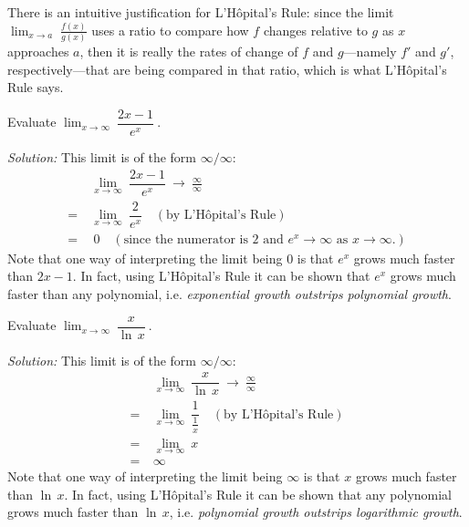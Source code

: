 There is an intuitive justification for L'H\^{o}pital's Rule: since the limit
$\lim_{x \to a}\;\frac{f(x)}{g(x)}$
uses a ratio to compare how $f$ changes relative to $g$ as $x$ approaches $a$,
then it is really the rates of change of $f$ and $g$---namely $f'$ and $g'$,
respectively---that are being compared in that ratio, which is what
L'H\^{o}pital's Rule says.

\begin{exmp}\label{exmp:limxexpx}
\noindent Evaluate $\displaystyle\lim_{x \to \infty}~\dfrac{2x - 1}{e^x}~$.\vspace{1mm}
\par\noindent\emph{Solution:} This limit is of the form $\infty/\infty$:
\begin{align*}
&\lim_{x \to \infty}~\dfrac{2x - 1}{e^x} ~\to~ \frac{\infty}{\infty}\\
=~ &\lim_{x \to \infty}~\dfrac{2}{e^x} \quad(\text{by L'H\^{o}pital's Rule})\\
=~ &~0 \quad(\text{since the numerator is $2$ and $e^x \to \infty$ as $x \to \infty$.})
\end{align*}
Note that one way of interpreting the limit being $0$ is that $e^x$ grows much
faster than $2x - 1$. In fact, using L'H\^{o}pital's Rule it can be shown that
$e^x$ grows much faster than any polynomial, i.e. \emph{exponential growth
outstrips polynomial growth}.
\end{exmp}
\vspace{-0.7em}
\divider
\newpage
\begin{exmp}\label{exmp:limxlnx}
\noindent Evaluate $\displaystyle\lim_{x \to \infty}~\dfrac{x}{\ln\,x}~$.\vspace{1mm}
\par\noindent\emph{Solution:} This limit is of the form $\infty/\infty$:
\begin{align*}
&\lim_{x \to \infty}~\dfrac{x}{\ln\,x} ~\to~ \frac{\infty}{\infty}\\
=~ &\lim_{x \to \infty}~\dfrac{1}{\frac{1}{x}} \quad(\text{by L'H\^{o}pital's Rule})\\[6pt]
=~ &\lim_{x \to \infty}~x\\
=~ &\infty
\end{align*}
Note that one way of interpreting the limit being $\infty$ is that $x$ grows
much faster than $\ln\,x$. In fact, using L'H\^{o}pital's Rule it can be shown
that any polynomial grows much faster than $\ln\,x$, i.e. \emph{polynomial
growth outstrips logarithmic growth}.
\end{exmp}
